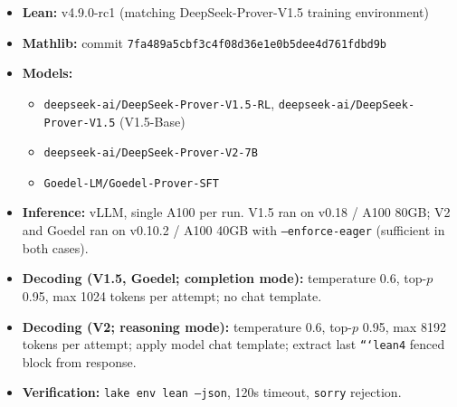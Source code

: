 \documentclass{article}
\begin{document}
\begin{itemize}
\item \textbf{Lean:} v4.9.0-rc1 (matching DeepSeek-Prover-V1.5 training environment)
\item \textbf{Mathlib:} commit \texttt{7fa489a5cbf3c4f08d36e1e0b5dee4d761fdbd9b}
\item \textbf{Models:}
  \begin{itemize}
    \item \texttt{deepseek-ai/DeepSeek-Prover-V1.5-RL}, \texttt{deepseek-ai/DeepSeek-Prover-V1.5} (V1.5-Base)
    \item \texttt{deepseek-ai/DeepSeek-Prover-V2-7B}
    \item \texttt{Goedel-LM/Goedel-Prover-SFT}
  \end{itemize}
\item \textbf{Inference:} vLLM, single A100 per run. V1.5 ran on v0.18 / A100 80GB; V2 and Goedel ran on v0.10.2 / A100 40GB with \texttt{--enforce-eager} (sufficient in both cases).
\item \textbf{Decoding (V1.5, Goedel; completion mode):} temperature 0.6, top-$p$ 0.95, max 1024 tokens per attempt; no chat template.
\item \textbf{Decoding (V2; reasoning mode):} temperature 0.6, top-$p$ 0.95, max 8192 tokens per attempt; apply model chat template; extract last \texttt{```lean4} fenced block from response.
\item \textbf{Verification:} \texttt{lake env lean --json}, 120s timeout, \texttt{sorry} rejection.
\end{itemize}
\end{document}
